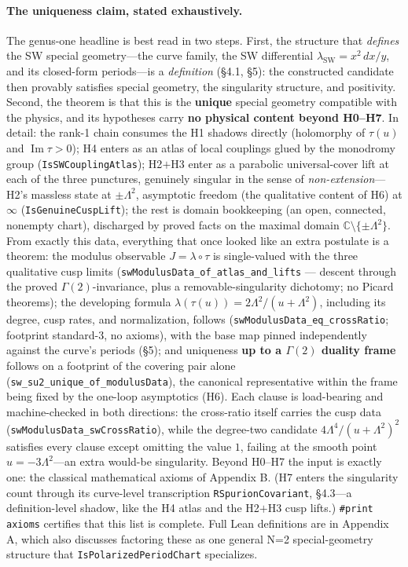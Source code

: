 \documentclass{article}
\theoremstyle{plain}
\theoremstyle{definition}
\numberwithin{equation}{section}
\newcommand{\C}{\mathbb{C}}
\newcommand{\Imag}{\operatorname{Im}}
\newcommand{\code}[1]{\texttt{#1}}
\begin{document}
\paragraph{The uniqueness claim, stated exhaustively.} The genus-one headline is best read
in two steps. First, the structure that \emph{defines} the SW special geometry---the curve
family, the SW differential $\lambda_{\mathrm{SW}} = x^2\,dx/y$, and its closed-form
periods---is a \emph{definition} (\S4.1, \S5): the constructed candidate then provably
satisfies special geometry, the singularity structure, and positivity. Second, the theorem
is that this is the \textbf{unique} special geometry compatible with the physics, and its
hypotheses carry \textbf{no physical content beyond H0--H7}. In detail: the rank-1 chain
consumes the H1 shadows directly (holomorphy of $\tau(u)$ and $\Imag\tau > 0$); H4 enters
as an atlas of local couplings glued by the monodromy group (\code{IsSWCouplingAtlas});
H2$+$H3 enter as a parabolic universal-cover lift at each of the three punctures, genuinely
singular in the sense of \emph{non-extension}---H2's massless state at $\pm\Lambda^2$,
asymptotic freedom (the qualitative content of H6) at $\infty$
(\code{IsGenuineCuspLift}); the rest is domain bookkeeping (an open, connected, nonempty
chart), discharged by proved facts on the maximal domain $\C\setminus\{\pm\Lambda^2\}$.
From exactly this data, everything that once looked like an extra postulate is a theorem:
the modulus observable $J = \lambda\circ\tau$ is single-valued with the three qualitative
cusp limits (\code{swModulusData\_of\_atlas\_and\_lifts} --- descent through the proved
$\Gamma(2)$-invariance, plus a removable-singularity dichotomy; no Picard theorems); the
developing formula $\lambda(\tau(u)) = 2\Lambda^2/(u+\Lambda^2)$, including its degree,
cusp rates, and normalization, follows (\code{swModulusData\_eq\_crossRatio}; footprint
standard-3, no axioms), with the base map pinned independently against the curve's periods
(\S5); and uniqueness \textbf{up to a $\Gamma(2)$ duality frame} follows on a footprint of
the covering pair alone (\code{sw\_su2\_unique\_of\_modulusData}), the canonical
representative within the frame being fixed by the one-loop asymptotics (H6). Each clause
is load-bearing and machine-checked in both directions: the cross-ratio itself carries the
cusp data (\code{swModulusData\_swCrossRatio}), while the degree-two candidate
$4\Lambda^4/(u+\Lambda^2)^2$ satisfies every clause except omitting the value $1$, failing
at the smooth point $u = -3\Lambda^2$---an extra would-be singularity. Beyond H0--H7 the
input is exactly one: the classical mathematical axioms of Appendix B. (H7 enters the
singularity count through its curve-level transcription \code{RSpurionCovariant},
\S4.3---a definition-level shadow, like the H4 atlas and the H2$+$H3 cusp lifts.)
\code{\#print axioms} certifies that this list is complete. Full Lean definitions are in Appendix A, which also discusses factoring these as
one general N=2 special-geometry structure that \code{IsPolarizedPeriodChart} specializes.
\end{document}

